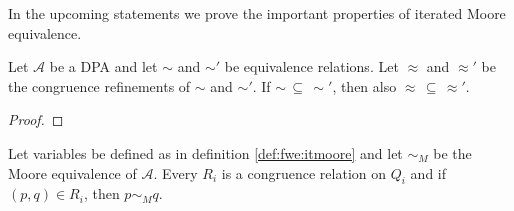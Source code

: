 In the upcoming statements we prove the important properties of iterated Moore equivalence.

\begin{lem}
\label{lem:fwe:cong_refin_subset}
	Let $\mathcal{A}$ be a DPA and let $\sim$ and $\sim'$ be equivalence relations. Let $\approx$ and $\approx'$ be the congruence refinements of $\sim$ and $\sim'$. If $\sim \,\subseteq\, \sim'$, then also $\approx \,\subseteq\, \approx'$.
\end{lem}

\begin{proof}
\end{proof}

\begin{lem}
	Let variables be defined as in definition \ref{def:fwe:itmoore} and let $\sim_M$ be the Moore equivalence of $\mathcal{A}$. Every $R_i$ is a congruence relation on $Q_i$ and if $(p, q) \in R_i$, then $p \sim_M q$.
\end{lem}

